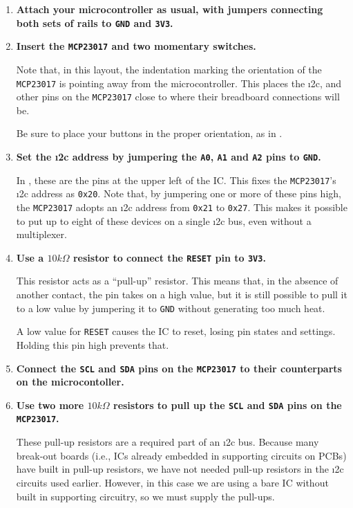 \begin{enumerate}
	\item \textbf{Attach your microcontroller as usual, with jumpers connecting both sets of rails to \texttt{GND} and \texttt{3V3}.}

	\item \textbf{Insert the \texttt{MCP23017} and two momentary switches.}

	Note that, in this layout, the indentation marking the orientation of the \texttt{MCP23017} is pointing away from the microcontroller.
  This places the \i2c, \gpios and other pins on the \texttt{MCP23017} close to where their breadboard connections will be.

	\smallskip
	Be sure to place your buttons in the proper orientation, as in .

	\item \textbf{Set the \i2c address by jumpering the \texttt{A0}, \texttt{A1} and \texttt{A2} pins to \texttt{GND}.}

	In , these are the pins at the upper left of the IC.
	This fixes the \texttt{MCP23017}'s \i2c address as \verb|0x20|.
	Note that, by jumpering one or more of these pins high, the \texttt{MCP23017} adopts an \i2c address from \verb|0x21| to \verb|0x27|.
	This makes it possible to put up to eight of these devices on a single \i2c bus, even without a multiplexer.

	\item \textbf{Use a $10k\Omega$ resistor to connect the \texttt{RESET} pin to \texttt{3V3}.}

	This resistor acts as a ``pull-up'' resistor.
	This means that, in the absence of another contact, the pin takes on a high value, but it is still possible to pull it to a low value by jumpering it to \texttt{GND} without generating too much heat.

	\smallskip
	A low value for \texttt{RESET} causes the IC to reset, losing pin states and settings.
	Holding this pin high prevents that.

	\item \textbf{Connect the \texttt{SCL} and \texttt{SDA} pins on the \texttt{MCP23017} to their counterparts on the microcontoller.}


	\item \textbf{Use two more $10k\Omega$ resistors to pull up the \texttt{SCL} and \texttt{SDA} pins on the \texttt{MCP23017}.}

	These pull-up resistors are a required part of an \i2c bus.
  Because many break-out boards (i.e., ICs already embedded in supporting circuits on PCBs) have built in pull-up resistors, we have not needed pull-up resistors in the \i2c circuits used earlier.
	However, in this case we are using a bare IC without built in supporting circuitry, so we must supply the pull-ups.


\end{enumerate}
